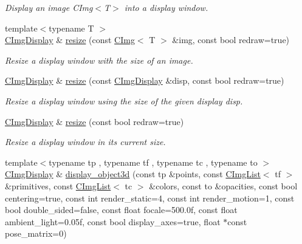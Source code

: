 \begin{DoxyCompactItemize}
\begin{DoxyCompactList}\small\item\em Display an image C\-Img$<$\-T$>$ into a display window. \end{DoxyCompactList}\item 
{\footnotesize template$<$typename T $>$ }\\\hyperlink{structcimg__library_1_1_c_img_display}{C\-Img\-Display} \& \hyperlink{structcimg__library_1_1_c_img_display_a3202518cfea76bfee4e2368603480aa7}{resize} (const \hyperlink{structcimg__library_1_1_c_img}{C\-Img}$<$ T $>$ \&img, const bool redraw=true)
\begin{DoxyCompactList}\small\item\em Resize a display window with the size of an image. \end{DoxyCompactList}\item 
\hypertarget{structcimg__library_1_1_c_img_display_ac30fbf27d5d132fc45e51c56d8dd6271}{\hyperlink{structcimg__library_1_1_c_img_display}{C\-Img\-Display} \& \hyperlink{structcimg__library_1_1_c_img_display_ac30fbf27d5d132fc45e51c56d8dd6271}{resize} (const \hyperlink{structcimg__library_1_1_c_img_display}{C\-Img\-Display} \&disp, const bool redraw=true)}\label{structcimg__library_1_1_c_img_display_ac30fbf27d5d132fc45e51c56d8dd6271}

\begin{DoxyCompactList}\small\item\em Resize a display window using the size of the given display {\ttfamily disp}. \end{DoxyCompactList}\item 
\hypertarget{structcimg__library_1_1_c_img_display_adb8b42ca0e236a43bd030252b75a274c}{\hyperlink{structcimg__library_1_1_c_img_display}{C\-Img\-Display} \& \hyperlink{structcimg__library_1_1_c_img_display_adb8b42ca0e236a43bd030252b75a274c}{resize} (const bool redraw=true)}\label{structcimg__library_1_1_c_img_display_adb8b42ca0e236a43bd030252b75a274c}

\begin{DoxyCompactList}\small\item\em Resize a display window in its current size. \end{DoxyCompactList}\item 
\hypertarget{structcimg__library_1_1_c_img_display_aacdf47344c0b7e9c76a2abae0cd6d834}{{\footnotesize template$<$typename tp , typename tf , typename tc , typename to $>$ }\\\hyperlink{structcimg__library_1_1_c_img_display}{C\-Img\-Display} \& \hyperlink{structcimg__library_1_1_c_img_display_aacdf47344c0b7e9c76a2abae0cd6d834}{display\-\_\-object3d} (const tp \&points, const \hyperlink{structcimg__library_1_1_c_img_list}{C\-Img\-List}$<$ tf $>$ \&primitives, const \hyperlink{structcimg__library_1_1_c_img_list}{C\-Img\-List}$<$ tc $>$ \&colors, const to \&opacities, const bool centering=true, const int render\-\_\-static=4, const int render\-\_\-motion=1, const bool double\-\_\-sided=false, const float focale=500.\-0f, const float ambient\-\_\-light=0.\-05f, const bool display\-\_\-axes=true, float $\ast$const pose\-\_\-matrix=0)}\label{structcimg__library_1_1_c_img_display_aacdf47344c0b7e9c76a2abae0cd6d834}


\end{DoxyCompactItemize}

